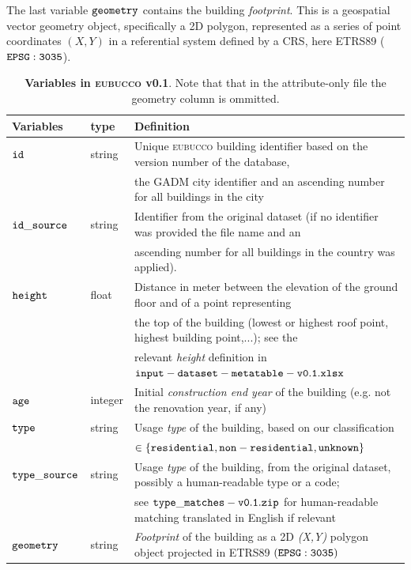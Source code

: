 \documentclass[fleqn,10pt]{wlscirep}
\begin{document}
The last variable $\tt{geometry}$ contains the building \textit{footprint}. This is a geospatial vector geometry object, specifically a 2D polygon, represented as a series of point coordinates $(X,Y)$ in a referential system defined by a CRS, here ETRS89 ($\tt{EPSG:3035}$). 

\begin{table}[h!]
\centering
\renewcommand{\arraystretch}{1.4}
\begin{tabular}{lll}
\hline
\textbf{Variables} & \textbf{\textbf{type}} & \textbf{Definition} \\
\hline
${\tt id}$ & string & Unique \textsc{eubucco} building identifier based on the version number of the database, 
\\ & & the GADM city identifier and an ascending number for all buildings in the city \\

${\tt id\_source}$ & string & Identifier from the original dataset (if no identifier was provided the file name and an 
\\ & & ascending number for all buildings in the country was applied). \\

${\tt height}$ & float & Distance in meter between the elevation of the ground floor and of a point representing \\
& & the top of the building (lowest or highest roof point, highest building point,...); see the \\
& & relevant \textit{height} definition in ${\tt input-dataset-metatable-v0.1.xlsx}$ \\

$\tt{age}$ & integer &  Initial \textit{construction end year} of the building (e.g. not the renovation year, if any) \\

$\tt{type}$ & string & Usage \textit{type} of the building, based on our classification \\
&& $ \in \{\tt{residential},\tt{non-residential},\tt{unknown}\} $ \\

${\tt type\_source}$ & string & Usage \textit{type} of the building, from the original dataset, possibly a human-readable type or a code; \\
& & see ${\tt type\_matches-v0.1.zip}$ for human-readable matching translated in English if relevant \\

${\tt geometry}$ & string & \textit{Footprint} of the building as a 2D \textit{(X,Y)} polygon object projected in ETRS89
$(\tt{EPSG:3035})$ \\
\hline
\end{tabular}
\caption{\label{tab:variables}\textbf{Variables in \textsc{eubucco} v0.1}. Note that that in the attribute-only file the geometry column is ommitted.}
\end{table}
\end{document}
